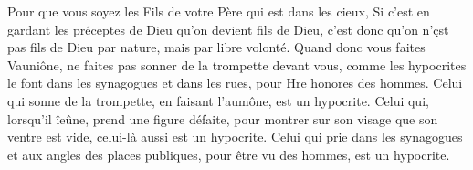 Pour que vous soyez les Fils de votre Père qui est dans les cieux, Si c’est en gardant les préceptes de Dieu qu’on devient fils de Dieu, c’est donc qu’on n’çst pas fils de Dieu par nature, mais par libre volonté. Quand donc vous faites Vauniône, ne faites pas sonner de la trompette devant vous, comme les hypocrites le font dans les synagogues et dans les rues, pour Hre honores des hommes. Celui qui sonne de la trompette, en faisant l’aumône, est un hypocrite. Celui qui, lorsqu’il îeûne, prend une figure défaite, pour montrer sur son visage que son ventre est vide, celui-là aussi est un hypocrite. Celui qui prie dans les synagogues et aux angles des places publiques, pour être vu des hommes, est un hypocrite.
